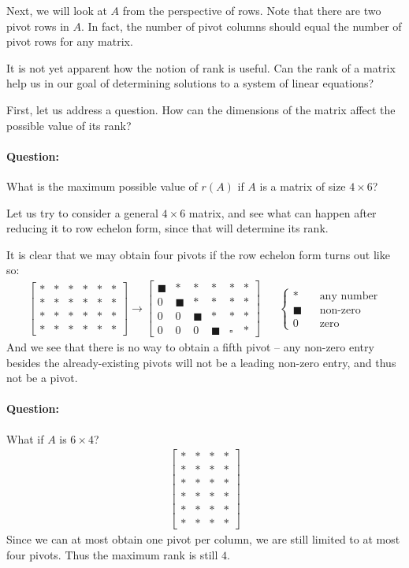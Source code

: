 \documentclass[11pt]{article}
\newcommand{\ques}{\paragraph{Question:}}
\begin{document}
Next, we will look at $A$ from the perspective of rows. Note that there are two pivot rows in $A$. In fact, the number of pivot columns should equal the number of pivot rows for any matrix.

It is not yet apparent how the notion of rank is useful. Can the rank of a matrix help us in our goal of determining solutions to a system of linear equations?


First, let us address a question. How can the dimensions of the matrix affect the possible value of its rank?

\ques What is the maximum possible value of $r(A)$ if $A$ is a matrix of size $4 \times 6$?

Let us try to consider a general $4 \times 6$ matrix, and see what can happen after reducing it to row echelon form, since that will determine its rank.

It is clear that we may obtain four pivots if the row echelon form turns out like so:
\begin{align*}
\begin{bmatrix}
* & * & * & * & * & *
\\
* & * & * & * & * & *
\\
* & * & * & * & * & *
\\
* & * & * & * & * & *
\end{bmatrix}
\to
\begin{bmatrix}
\blacksquare & * & * & * & * & *
\\
0 & \blacksquare & * & * & * & *
\\
0 & 0 & \blacksquare & * & * & *
\\
0 & 0 & 0 & \blacksquare & \square & *
\end{bmatrix}
&&
\left\{
\begin{aligned}
* && \text{any number}
\\
\blacksquare && \text{non-zero}
\\
0 && \text{zero}
\end{aligned}
\right.
\end{align*}
And we see that there is no way to obtain a fifth pivot -- any non-zero entry besides the already-existing pivots will not be a leading non-zero entry, and thus not be a pivot.

\ques What if $A$ is $6 \times 4$?
\begin{align*}
\begin{bmatrix}
* & * & * & *
\\
* & * & * & *
\\
* & * & * & *
\\
* & * & * & *
\\
* & * & * & *
\\
* & * & * & *
\end{bmatrix}
\end{align*}
Since we can at most obtain one pivot per column, we are still limited to at most four pivots. Thus the maximum rank is still $4$.
\end{document}
